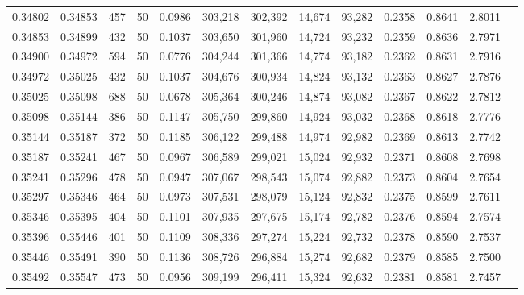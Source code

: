 \begin{tabular}{rrrrrrrrrrrrr}
0.34802 & 0.34853 &   457 &  50 &                                     0.0986 & 303,218 & 302,392 &  14,674 &  93,282 & 0.2358 & 0.8641 & 2.8011 \\
0.34853 & 0.34899 &   432 &  50 &                                     0.1037 & 303,650 & 301,960 &  14,724 &  93,232 & 0.2359 & 0.8636 & 2.7971 \\
0.34900 & 0.34972 &   594 &  50 &                                     0.0776 & 304,244 & 301,366 &  14,774 &  93,182 & 0.2362 & 0.8631 & 2.7916 \\
0.34972 & 0.35025 &   432 &  50 &                                     0.1037 & 304,676 & 300,934 &  14,824 &  93,132 & 0.2363 & 0.8627 & 2.7876 \\
0.35025 & 0.35098 &   688 &  50 &                                     0.0678 & 305,364 & 300,246 &  14,874 &  93,082 & 0.2367 & 0.8622 & 2.7812 \\
0.35098 & 0.35144 &   386 &  50 &                                     0.1147 & 305,750 & 299,860 &  14,924 &  93,032 & 0.2368 & 0.8618 & 2.7776 \\
0.35144 & 0.35187 &   372 &  50 &                                     0.1185 & 306,122 & 299,488 &  14,974 &  92,982 & 0.2369 & 0.8613 & 2.7742 \\
0.35187 & 0.35241 &   467 &  50 &                                     0.0967 & 306,589 & 299,021 &  15,024 &  92,932 & 0.2371 & 0.8608 & 2.7698 \\
0.35241 & 0.35296 &   478 &  50 &                                     0.0947 & 307,067 & 298,543 &  15,074 &  92,882 & 0.2373 & 0.8604 & 2.7654 \\
0.35297 & 0.35346 &   464 &  50 &                                     0.0973 & 307,531 & 298,079 &  15,124 &  92,832 & 0.2375 & 0.8599 & 2.7611 \\
0.35346 & 0.35395 &   404 &  50 &                                     0.1101 & 307,935 & 297,675 &  15,174 &  92,782 & 0.2376 & 0.8594 & 2.7574 \\
0.35396 & 0.35446 &   401 &  50 &                                     0.1109 & 308,336 & 297,274 &  15,224 &  92,732 & 0.2378 & 0.8590 & 2.7537 \\
0.35446 & 0.35491 &   390 &  50 &                                     0.1136 & 308,726 & 296,884 &  15,274 &  92,682 & 0.2379 & 0.8585 & 2.7500 \\
0.35492 & 0.35547 &   473 &  50 &                                     0.0956 & 309,199 & 296,411 &  15,324 &  92,632 & 0.2381 & 0.8581 & 2.7457 \\

\end{tabular}
